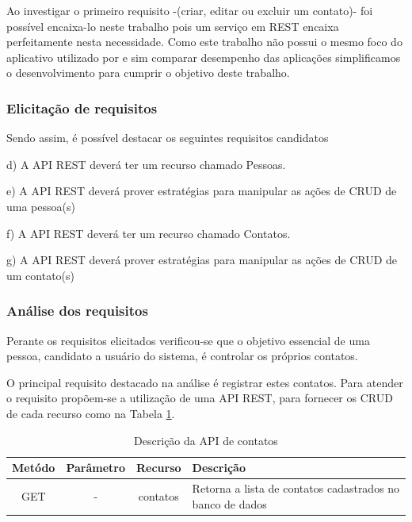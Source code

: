   Ao investigar o primeiro requisito -(criar, editar ou excluir um contato)- foi possível encaixa-lo neste trabalho pois um serviço em
  REST encaixa perfeitamente nesta necessidade. Como este trabalho não possui o mesmo foco do aplicativo utilizado por 
  e sim comparar desempenho das aplicações simplificamos o desenvolvimento para cumprir o objetivo deste trabalho.

\subsubsection{Elicitação de requisitos}

  Sendo assim, é possível destacar os seguintes requisitos candidatos

  \begin{compactitem}
    \item[d)] A \ac{API} \ac{REST} deverá ter um recurso chamado Pessoas.
    \item[e)] A \ac{API} \ac{REST} deverá prover estratégias para manipular as ações de CRUD de uma pessoa(s)
    \item[f)] A \ac{API} \ac{REST} deverá ter um recurso chamado Contatos.
    \item[g)] A \ac{API} \ac{REST} deverá prover estratégias para manipular as ações de CRUD de um contato(s)
  \end{compactitem}
  
\subsubsection{Análise dos requisitos}
  
  Perante os requisitos elicitados verificou-se que o objetivo essencial de uma pessoa, candidato a usuário
  do sistema, é controlar os próprios contatos.
  
  O principal requisito destacado na análise é registrar estes contatos. Para atender o requisito
  propõem-se a utilização de uma \ac{API} \ac{REST}, para fornecer os \ac{CRUD} de cada recurso
  como na Tabela \ref{tab:api-descricao-contato}.
 
  
  \begin{table}[H]
    \centering
    \footnotesize
    \vspace{0.5cm}
    \setlength{\abovecaptionskip}{0pt}
    \setlength{\belowcaptionskip}{0pt}
    \caption[Descrição da API de contatos]{Descrição da API de contatos}
    \label{tab:api-descricao-contato}
    \begin{tabular}{c|c|c|p{8cm}}
      \hline \hline
      Metódo  &	Parâmetro &	Recurso &	Descrição \\
      \hline \hline
      GET	& -	& contatos	& Retorna a lista de contatos 
					  cadastrados no banco de dados \\
      \hline \hline
    \end{tabular}
  \end{table}
  
